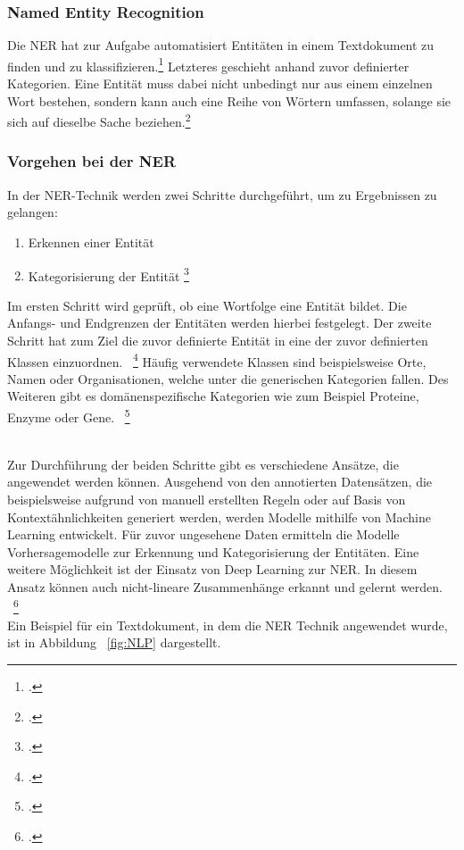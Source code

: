 \subsubsection{Named Entity Recognition}
Die \acl{NER} hat zur Aufgabe automatisiert Entitäten in einem Textdokument zu finden und zu klassifizieren.\footcite[\vglf][]{kulkrni2022} Letzteres geschieht anhand zuvor definierter Kategorien.
Eine Entität muss dabei nicht unbedingt nur aus einem einzelnen Wort bestehen, sondern kann auch eine Reihe von Wörtern umfassen, solange sie sich auf dieselbe Sache beziehen.\footcite[\vglf][]{strobl2022}

\subsubsection{Vorgehen bei der NER}
In der \ac{NER}-Technik werden zwei Schritte durchgeführt, um zu Ergebnissen zu gelangen:

\begin{enumerate}
    \item Erkennen einer Entität
    \item Kategorisierung der Entität \footcite[\vglf][ \& 230]{zong2021}
\end{enumerate}


Im ersten Schritt wird geprüft, ob eine Wortfolge eine Entität bildet. Die Anfangs- und Endgrenzen der Entitäten werden hierbei festgelegt. Der zweite Schritt hat zum Ziel die zuvor definierte Entität in eine der zuvor definierten Klassen einzuordnen. ~\footcite[\vglf][]{bast2016}
Häufig verwendete Klassen sind beispielsweise Orte, Namen oder Organisationen, welche unter die generischen Kategorien fallen. Des Weiteren gibt es domänenspezifische Kategorien wie zum Beispiel Proteine, Enzyme oder Gene. ~\footcite[\vglf][]{li.2018}

\\
Zur Durchführung der beiden Schritte gibt es verschiedene Ansätze, die angewendet werden können. Ausgehend von den annotierten Datensätzen, die beispielsweise aufgrund von manuell erstellten Regeln oder auf Basis von Kontextähnlichkeiten generiert werden, werden Modelle mithilfe von Machine Learning entwickelt.
Für zuvor ungesehene Daten ermitteln die Modelle Vorhersagemodelle zur Erkennung und Kategorisierung der Entitäten. Eine weitere Möglichkeit ist der Einsatz von Deep Learning zur \ac{NER}. In diesem Ansatz können auch nicht-lineare Zusammenhänge erkannt und gelernt werden. ~\footcite[\vglf][]{li.2018}
\\
Ein Beispiel für ein Textdokument, in dem die \ac{NER} Technik angewendet wurde, ist in Abbildung ~\ref{fig:NLP} dargestellt.\\


